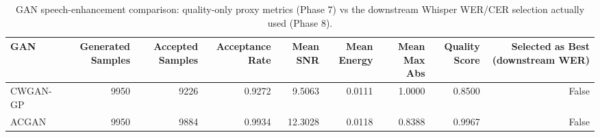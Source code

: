 \begin{table}
\caption{GAN speech-enhancement comparison: quality-only proxy metrics (Phase 7) vs the downstream Whisper WER/CER selection actually used (Phase 8).}
\label{tab:table_3_gan_comparison}
\begin{tabular}{lrrrrrrrr}
\toprule
GAN & Generated Samples & Accepted Samples & Acceptance Rate & Mean SNR & Mean Energy & Mean Max Abs & Quality Score & Selected as Best (downstream WER) \\
\midrule
CWGAN-GP & 9950 & 9226 & 0.9272 & 9.5063 & 0.0111 & 1.0000 & 0.8500 & False \\
ACGAN & 9950 & 9884 & 0.9934 & 12.3028 & 0.0118 & 0.8388 & 0.9967 & False \\
\bottomrule
\end{tabular}
\end{table}

